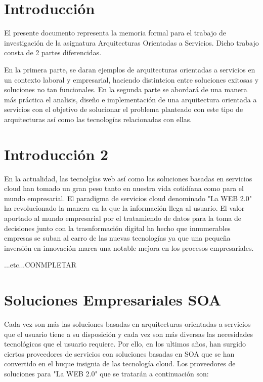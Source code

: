 \documentclass[a4paper,11pt]{book}
\begin{document}


\tableofcontents
\listoffigures

%

%


\chapter{Introducción}

El presente documento representa la memoria formal para el trabajo de investigación de la asignatura Arquitecturas Orientadas a Servicios. Dicho trabajo consta de 2 partes diferencidas. 

En la primera parte, se daran ejemplos de arquitecturas orientadas a servicios en un contexto laboral y empresarial, haciendo distintcion entre soluciones exitosas y soluciones no tan funcionales. En la segunda parte se abordará de una manera más práctica el analisis, diseño e implementación de una arquitectura orientada a servicios con el objetivo de solucionar el problema planteado con este tipo de arquitecturas así como las tecnologías relacionadas con ellas. 

\chapter{Introducción 2}

En la actualidad, las tecnolgías web así como las soluciones basadas en servicios cloud han tomado un gran peso tanto en nuestra vida cotidíana como para el mundo empresarial. El paradigma de servicios cloud denominado "La WEB 2.0" ha revolucionado la manera en la que la información llega al usuario.  El valor aportado al mundo empresarial por el tratamiendo de datos para la toma de decisiones junto con la trasnformación digital ha hecho que innumerables empresas se suban al  carro de las nuevas tecnologías ya que una pequeña inversión en innovación marca una notable mejora en los procesos empresariales.

...etc...CONMPLETAR


\chapter{Soluciones Empresariales SOA}

Cada vez son más las soluciones basadas en arquitecturas orientadas a servicios que el usuario tiene a su disposición y cada vez son más diversas las necesidades tecnológicas que el usuario requiere. Por ello, en los ultimos años, han surgido ciertos proveedores de servicios con soluciones basadas en SOA que se han convertido en el buque insignia de las tecnología cloud. Los proveedores de soluciones para "La WEB 2.0" que se tratarán a continuación son:  
\end{document}
